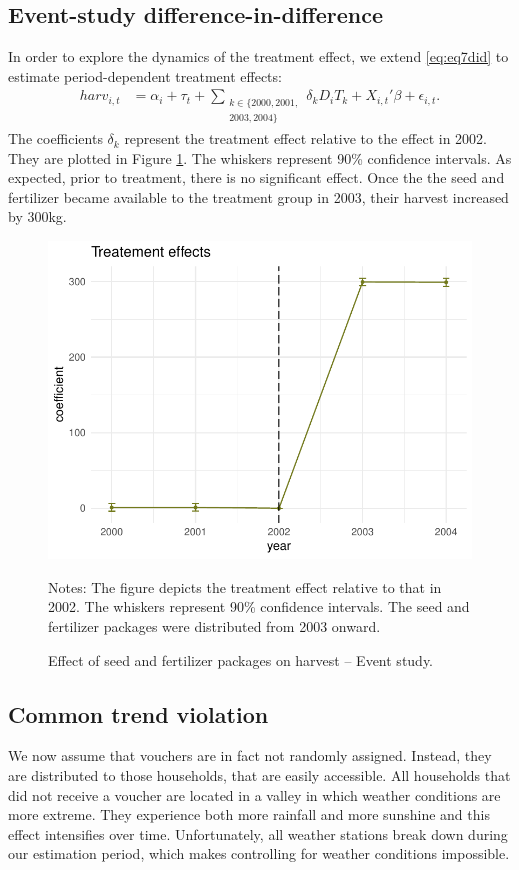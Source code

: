 \subsection*{Event-study difference-in-difference}

In order to explore the dynamics of the treatment effect, we extend \eqref{eq:eq7did} to estimate period-dependent treatment effects:\begin{align}
	\label{eq:eq7did_event}
	harv_{i,t} &= \alpha_i + \tau_t + \sum_{\substack{k\in  \{2000,2001, \\2003,2004\}}}\delta_k D_{i} T_k + X_{i,t}'\beta + \epsilon_{i,t}.
\end{align}
The coefficients $\delta_k$ represent the treatment effect relative to the effect in 2002. They are plotted in Figure \ref{fig:did_c}. The whiskers represent 90\% confidence intervals. As expected, prior to treatment, there is no significant effect. Once the the seed and fertilizer became available to the treatment group in 2003, their harvest increased by 300kg.


\begin{figure}[htb]
	\begin{center}
		\includegraphics[width=0.55\linewidth]{../figures/part5c.pdf}
	\end{center}
	\caption{Effect of seed and fertilizer packages on harvest -- Event study.}
	\label{fig:did_c}	{\footnotesize Notes: The figure depicts the treatment effect relative to that in 2002. The whiskers represent 90\% confidence intervals. The seed and fertilizer packages were distributed from 2003 onward.}
\end{figure}


\subsection*{Common trend violation}

We now assume that vouchers are in fact not randomly assigned. Instead, they are distributed to those households, that are easily accessible. All households that did not receive a voucher are located in a valley in which weather conditions are more extreme. They experience both more rainfall and more sunshine and this effect intensifies over time. Unfortunately, all weather stations break down during our estimation period, which makes controlling for weather conditions impossible. 

